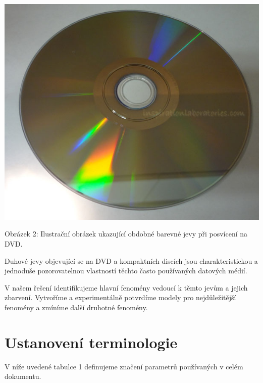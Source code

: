 \documentclass[titlepage]{article}
\begin{document}
 \label{image:2}
\includegraphics[width=\textwidth]{illustration2.png}
\begin{center}
    Obrázek 2: Ilustrační obrázek ukazující obdobné barevné jevy při posvícení na DVD. \cite{img2}
\end{center}

Duhové jevy objevující se na DVD a kompaktních discích jsou charakteristickou a jednoduše pozorovatelnou vlastností těchto často používaných datových médií.

V našem řešení identifikujeme hlavní fenomény vedoucí k těmto jevům a jejich zbarvení. Vytvoříme a experimentálně potvrdíme modely pro nejdůležitější fenomény a zmíníme další druhotné fenomény.

\pagebreak

\section{Ustanovení terminologie}
V níže uvedené tabulce 1 definujeme značení parametrů používaných v celém dokumentu.
\end{document}
